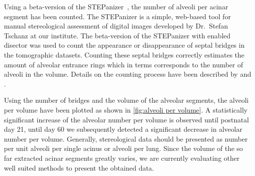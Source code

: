 Using a beta-version of the STEPanizer~\cite[available \href{http://stepanizer.com/}{online}]{Tschanz2010}, the number of alveoli per acinar segment has been counted. The STEPanizer is a simple, web-based tool for manual stereological assessment of digital images developed by Dr.\ Stefan Tschanz at our institute. The beta-version of the STEPanizer with enabled disector was used to count the appearance or disappearance of septal bridges in the tomographic datasets. Counting these septal bridges correctly estimates the amount of alveolar entrance rings which in terms corresponds to the number of alveoli in the volume. Details on the counting process have been described by \citet{Hyde2004} and \citet{Ochs2004}.

Using the number of bridges and the volume of the alveolar segments, the alveoli per volume have been plotted as shown in \autoref{fig:alveoli per volume}. A statistically significant increase of the alveolar number per volume is observed until postnatal day 21,  until day 60 we subsequently detected a significant decrease in alveolar number per volume. Generally, stereological data should be presented as number per unit \eg alveoli per single acinus or alveoli per lung. Since the volume of the so far extracted acinar segments greatly varies, we are currently evaluating other well suited methods to present the obtained data.

